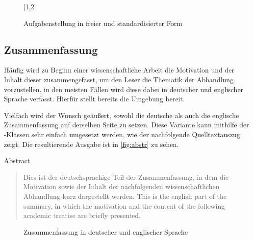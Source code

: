 \documentclass[%
  english,ngerman,%
  geometry=no,DIV=12,automark,%
]{tudscrartcl}
\begin{document}
%
\begin{figure}
[1,2]
\caption{Aufgabenstellung in freier und standardisierter Form}
\label{fig:task}
\end{figure}


\subsection{Zusammenfassung}
Häufig wird zu Beginn einer wissenschaftliche Arbeit die Motivation und der 
Inhalt dieser zusammengefasst, um den Leser die Thematik der Abhandlung 
vorzustellen. in den meisten Fällen wird diese dabei in deutscher und 
englischer Sprache verfasst. Hierfür stellt \KOMAScript{} bereits die Umgebung 
 bereit.

Vielfach wird der Wunsch geäußert, sowohl die deutsche als auch die englische 
Zusammenfassung auf derselben Seite zu setzen. Diese Variante kann mithilfe 
der \TUDScript-Klassen sehr einfach umgesetzt werden, wie der nachfolgende 
Quelltextauszug zeigt. Die resultierende Ausgabe ist in \autoref{fig:abstr} zu 
sehen.
%
\begin{Excerpt!}{Abstract}
\begin{abstract}
  Dies ist der deutschsprachige Teil der Zusammenfassung, in dem die
  Motivation sowie der Inhalt der nachfolgenden wissenschaftlichen
  Abhandlung kurz dargestellt werden.
\nextabstract[english]
  This is the english part of the summary, in which the motivation and
  the content of the following academic treatise are briefly presented.
\end{abstract}
\end{Excerpt!}
%
\begin{figure}
\centering
{}
\caption{Zusammenfassung in deutscher und englischer Sprache}
\label{fig:abstr}
\end{figure}
\end{document}
